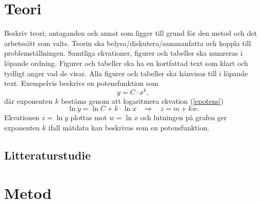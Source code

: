 \documentclass[a4paper]{article}
\begin{document}
\section{Teori}
Beskriv teori, antaganden och annat som ligger till grund för den metod och det arbetssätt som valts. Teorin ska belysa/diskutera/sammanfatta och koppla till problemställningen. Samtliga ekvationer, figurer och tabeller ska numreras i löpande ordning. Figurer och tabeller ska ha en kortfattad text som klart och tydligt anger vad de visar. Alla figurer och tabeller ska hänvisas till i löpande text.
Exempelvis beskrivs en potensfunktion som
\begin{equation} \label{epotens}
    y=C\cdot x^k,
\end{equation}
där exponenten $k$ bestäms genom att logaritmera ekvation (\ref{epotens})
\begin{equation}
    \ln y = \ln C + k\cdot \ln x \:\:\:\: \Rightarrow \:\:\:\: z = m + kw.
\end{equation}
Ekvationen $z = \ln y$ plottas mot $w = \ln x$ och lutningen på grafen ger exponenten $k$ ifall mätdata kan beskrivas som en potensfunktion.

%

\subsection{Litteraturstudie}


\section{Metod}
\end{document}
